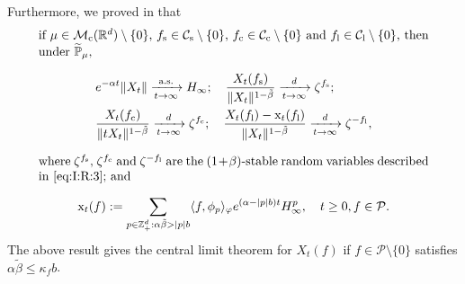 \documentclass[12pt,a4paper]{amsart}
\theoremstyle{plain}
\theoremstyle{definition}
\numberwithin{equation}{section}
\begin{document}
Furthermore, we proved in \cite[Theorem 1.6]{RenSongSunZhao2019Stable} that
\begin{equation}\label{eq:oldResult}
\begin{minipage}{0.9\textwidth}
if $\mu\in \mathcal M_\mathrm c(\mathbb R^d)\setminus \{0\}$, $f_\mathrm s\in \mathcal C_\mathrm s\setminus\{0\}$, $f_\mathrm c \in \mathcal C_\mathrm c\setminus\{0
\}$ and $f_\mathrm l \in \mathcal C_\mathrm l\setminus\{0\}$, then under $\mathbb {\widetilde P}_\mu$,
\[
\begin{split}
&e^{-\alpha t}\|X_t\| \xrightarrow[t\to \infty]{\text{a.s.}} H_\infty;
\quad \frac{X_t(f_\mathrm s)}{\|X_t\|^{1-\tilde \beta}} \xrightarrow[t\to \infty]{d} \zeta^{f_\mathrm s};
\\&\frac{X_t(f_\mathrm c)}{\|t X_t\|^{1-\tilde \beta} } \xrightarrow[t\to \infty]{d} \zeta^{f_\mathrm c};
\quad\frac{X_t(f_\mathrm l) - \mathrm x_t(f_\mathrm l)}{\|X_t\|^{1-\tilde \beta}}
\xrightarrow[t\to \infty]{d}
\zeta^{-f_\mathrm l},
\end{split}
\]
where $\zeta^{f_\mathrm s}$, $\zeta^{f_\mathrm c}$ and $\zeta^{-f_\mathrm l}$
are the $(1+\beta)$-stable random variables described in \eqref{eq:I:R:3}; and
\[
\mathrm x_t(f) : = \sum_{p\in \mathbb Z^d_+:\alpha \tilde \beta>|p|b}\langle f,\phi_p\rangle_\varphi e^{(\alpha-|p|b)t}H^p_{\infty},\quad t\geq 0, f\in \mathcal P.
\]
\end{minipage}
\end{equation}
	The above result gives the central limit theorem for $X_t(f)$ if $f\in \mathcal P\setminus\{0\}$ satisfies $\alpha \tilde \beta \leq \kappa_f b$. 
\end{document}
